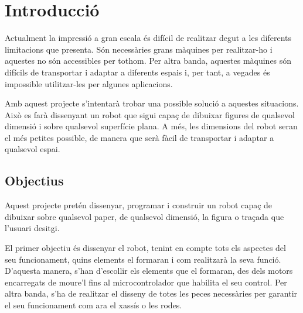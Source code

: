 \setlength\topmargin{8mm}
\onehalfspacing
\chapter{Introducció} %

\label{Chapter1} %


Actualment la impressió a gran escala és difícil de realitzar degut a les diferents limitacions que presenta. Són necessàries grans màquines per realitzar-ho i aquestes no són accessibles per tothom. Per altra banda, aquestes màquines són difícils de transportar i adaptar a diferents espais i, per tant, a vegades és impossible utilitzar-les per algunes aplicacions.

Amb aquest projecte s'intentarà trobar una possible solució a aquestes situacions. Això es farà dissenyant un robot que sigui capaç de dibuixar figures de qualsevol dimensió i sobre qualsevol superfície plana. A més, les dimensions del robot seran el més petites possible, de manera que serà fàcil de transportar i adaptar a qualsevol espai. 

\section{Objectius}
Aquest projecte pretén dissenyar, programar i construir un robot capaç de dibuixar sobre qualsevol paper, de qualsevol dimensió, la figura o traçada que l'usuari desitgi. 

El primer objectiu és dissenyar el robot, tenint en compte tots els aspectes del seu funcionament, quins elements el formaran i com realitzarà la seva funció. D'aquesta manera, s'han d'escollir els elements que el formaran, des dels motors encarregats de moure'l fins al microcontrolador que habilita el seu control. Per altra banda, s'ha de realitzar el disseny de totes les peces necessàries per garantir el seu funcionament com ara el xassís o les rodes. 

